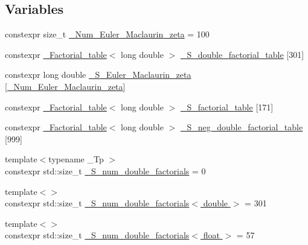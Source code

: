 \subsection*{Variables}
\begin{DoxyCompactItemize}
\item 
constexpr size\+\_\+t \hyperlink{namespacestd_1_1____detail_ab27e687e1052be7a72de187e0dead124}{\+\_\+\+Num\+\_\+\+Euler\+\_\+\+Maclaurin\+\_\+zeta} = 100
\item 
constexpr \hyperlink{structstd_1_1____detail_1_1__Factorial__table}{\+\_\+\+Factorial\+\_\+table}$<$ long double $>$ \hyperlink{namespacestd_1_1____detail_a6d1131fefdb30b2746c76ff801bdc833}{\+\_\+\+S\+\_\+double\+\_\+factorial\+\_\+table} \mbox{[}301\mbox{]}
\item 
constexpr long double \hyperlink{namespacestd_1_1____detail_acd941b49595dd03e93c88107ad2f68c2}{\+\_\+\+S\+\_\+\+Euler\+\_\+\+Maclaurin\+\_\+zeta} \mbox{[}\hyperlink{namespacestd_1_1____detail_ab27e687e1052be7a72de187e0dead124}{\+\_\+\+Num\+\_\+\+Euler\+\_\+\+Maclaurin\+\_\+zeta}\mbox{]}
\item 
constexpr \hyperlink{structstd_1_1____detail_1_1__Factorial__table}{\+\_\+\+Factorial\+\_\+table}$<$ long double $>$ \hyperlink{namespacestd_1_1____detail_a008b54abe31c1027aefdfd7a76a40e99}{\+\_\+\+S\+\_\+factorial\+\_\+table} \mbox{[}171\mbox{]}
\item 
constexpr \hyperlink{structstd_1_1____detail_1_1__Factorial__table}{\+\_\+\+Factorial\+\_\+table}$<$ long double $>$ \hyperlink{namespacestd_1_1____detail_adb3fbe0d6f7c40b02e479b63d547f57c}{\+\_\+\+S\+\_\+neg\+\_\+double\+\_\+factorial\+\_\+table} \mbox{[}999\mbox{]}
\item 
{\footnotesize template$<$typename \+\_\+\+Tp $>$ }\\constexpr std\+::size\+\_\+t \hyperlink{namespacestd_1_1____detail_a762f5ed905d1f926bfd8b16f8ea2c568}{\+\_\+\+S\+\_\+num\+\_\+double\+\_\+factorials} = 0
\item 
{\footnotesize template$<$$>$ }\\constexpr std\+::size\+\_\+t \hyperlink{namespacestd_1_1____detail_ae829eb6434a90060ee0650f1c71fb92d}{\+\_\+\+S\+\_\+num\+\_\+double\+\_\+factorials$<$ double $>$} = 301
\item 
{\footnotesize template$<$$>$ }\\constexpr std\+::size\+\_\+t \hyperlink{namespacestd_1_1____detail_ac55fdd5d901fcd9335503b16ec897444}{\+\_\+\+S\+\_\+num\+\_\+double\+\_\+factorials$<$ float $>$} = 57
\item 

\end{DoxyCompactItemize}
